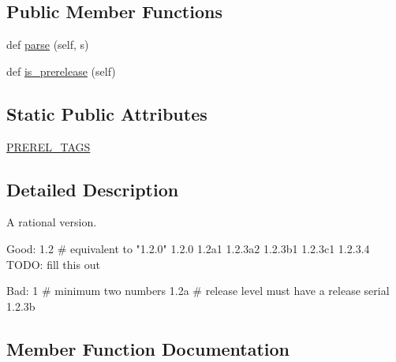 \subsection*{Public Member Functions}
\begin{DoxyCompactItemize}
\item 
def \hyperlink{classpip_1_1__vendor_1_1distlib_1_1version_1_1NormalizedVersion_aeff53986cc2938f948503d069bcd96f3}{parse} (self, s)
\item 
def \hyperlink{classpip_1_1__vendor_1_1distlib_1_1version_1_1NormalizedVersion_a41c1ad74b3d5c4fbe1c85f8ac760ca94}{is\+\_\+prerelease} (self)
\end{DoxyCompactItemize}
\subsection*{Static Public Attributes}
\begin{DoxyCompactItemize}
\item 
\hyperlink{classpip_1_1__vendor_1_1distlib_1_1version_1_1NormalizedVersion_af6c27838327bce8c17783034d59e7f06}{P\+R\+E\+R\+E\+L\+\_\+\+T\+A\+GS}
\end{DoxyCompactItemize}


\subsection{Detailed Description}
\begin{DoxyVerb}A rational version.

Good:
    1.2         # equivalent to "1.2.0"
    1.2.0
    1.2a1
    1.2.3a2
    1.2.3b1
    1.2.3c1
    1.2.3.4
    TODO: fill this out

Bad:
    1           # minimum two numbers
    1.2a        # release level must have a release serial
    1.2.3b
\end{DoxyVerb}
 

\subsection{Member Function Documentation}
\mbox{\label{classpip_1_1__vendor_1_1distlib_1_1version_1_1NormalizedVersion_a41c1ad74b3d5c4fbe1c85f8ac760ca94}} 
